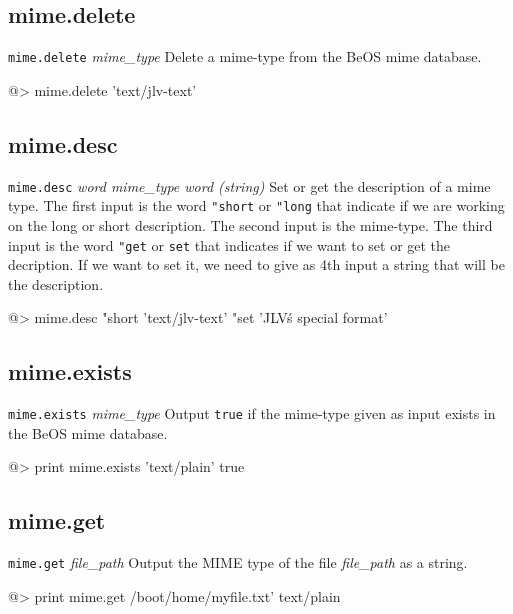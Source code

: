 \subsection*{mime.delete} 

{\tt mime.delete} {\it mime\_type}
\newline\newline
Delete a mime-type from the BeOS mime database.
\begin{verbatimtab}
@> mime.delete 'text/jlv-text'
\end{verbatimtab}

\subsection*{mime.desc} 

{\tt mime.desc} {\it word mime\_type word (string)}
\newline\newline
Set or get the description of a mime type. The first input is the word {\tt "short} or {\tt "long} that indicate if we are working on the long or short description. The second input is the mime-type. The third input is the word {\tt "get} or {\tt set} that indicates if we want to set or get the decription. If we want to set it, we need to give as 4th input a string that will be the description.
\begin{verbatimtab}
@> mime.desc "short 'text/jlv-text' "set 'JLV\'s special format'
\end{verbatimtab}

\subsection*{mime.exists} 

{\tt mime.exists} {\it mime\_type}
\newline\newline
Output {\tt true} if the mime-type given as input exists in the BeOS mime database.
\begin{verbatimtab}
@> print mime.exists 'text/plain'
true
\end{verbatimtab}

\subsection*{mime.get} 

{\tt mime.get} {\it file\_path}
\newline\newline
Output the MIME type of the file {\it file\_path} as a string.
\begin{verbatimtab}
@> print mime.get /boot/home/myfile.txt'
text/plain
\end{verbatimtab}

